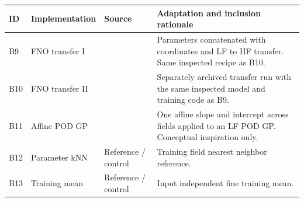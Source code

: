 \begin{tabular}{p{.045\linewidth}p{.20\linewidth}p{.23\linewidth}p{.39\linewidth}}
\toprule
ID & Implementation & Source & Adaptation and inclusion rationale \\
\midrule
B9 & FNO transfer I & \citep{lyu2023} & Parameters concatenated with coordinates and LF to HF transfer. Same inspected recipe as B10. \\
B10 & FNO transfer II & \citep{lyu2023} & Separately archived transfer run with the same inspected model and training code as B9. \\
B11 & Affine POD GP & \citep{zhang2018} & One affine slope and intercept across fields applied to an LF POD GP. Conceptual inspiration only. \\
B12 & Parameter kNN & Reference / control & Training field nearest neighbor reference. \\
B13 & Training mean & Reference / control & Input independent fine training mean. \\
\bottomrule
\end{tabular}
